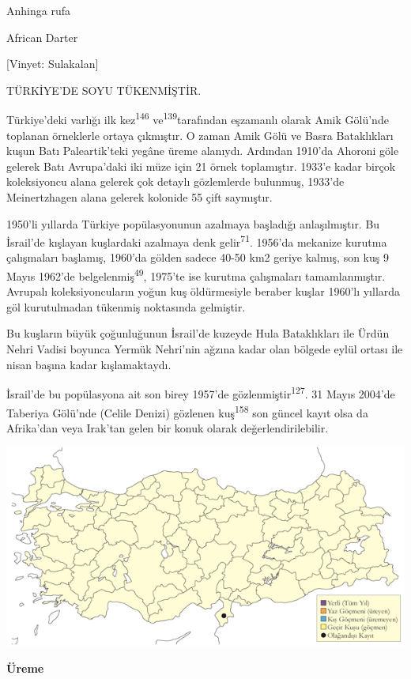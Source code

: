 \documentclass[
  letterpaper,
  DIV=11,
  numbers=noendperiod]{scrreprt}
\begin{document}
Anhinga rufa

African Darter

{[}Vinyet: Sulakalan{]}

TÜRKİYE'DE SOYU TÜKENMİŞTİR.

Türkiye'deki varlığı ilk kez\textsuperscript{146}
ve\textsuperscript{139}tarafından eşzamanlı olarak Amik Gölü'nde
toplanan örneklerle ortaya çıkmıştır. O zaman Amik Gölü ve Basra
Bataklıkları kuşun Batı Paleartik'teki yegâne üreme alanıydı. Ardından
1910'da Ahoroni göle gelerek Batı Avrupa'daki iki müze için 21 örnek
toplamıştır. 1933'e kadar birçok koleksiyoncu alana gelerek çok detaylı
gözlemlerde bulunmuş, 1933'de Meinertzhagen alana gelerek kolonide 55
çift saymıştır.

1950'li yıllarda Türkiye popülasyonunun azalmaya başladığı
anlaşılmıştır. Bu İsrail'de kışlayan kuşlardaki azalmaya denk
gelir\textsuperscript{71}. 1956'da mekanize kurutma çalışmaları
başlamış, 1960'da gölden sadece 40-50 km2 geriye kalmış, son kuş 9 Mayıs
1962'de belgelenmiş\textsuperscript{49}, 1975'te ise kurutma çalışmaları
tamamlanmıştır. Avrupalı koleksiyoncuların yoğun kuş öldürmesiyle
beraber kuşlar 1960'lı yıllarda göl kurutulmadan tükenmiş noktasında
gelmiştir.

Bu kuşların büyük çoğunluğunun İsrail'de kuzeyde Hula Bataklıkları ile
Ürdün Nehri Vadisi boyunca Yermük Nehri'nin ağzına kadar olan bölgede
eylül ortası ile nisan başına kadar kışlamaktaydı.

İsrail'de bu popülasyona ait son birey 1957'de
gözlenmiştir\textsuperscript{127}. 31 Mayıs 2004'de Taberiya Gölü'nde
(Celile Denizi) gözlenen kuş\textsuperscript{158} son güncel kayıt olsa
da Afrika'dan veya Irak'tan gelen bir konuk olarak değerlendirilebilir.

\includegraphics{images/harita_Page_080.png}

\textbf{Üreme}
\end{document}
